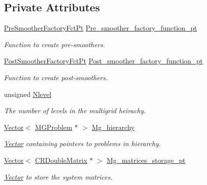 \subsection*{Private Attributes}
\begin{DoxyCompactItemize}
\item 
\hyperlink{classoomph_1_1MGSolver_a43de5ad4985ae1bbe68388619a9db32a}{Pre\+Smoother\+Factory\+Fct\+Pt} \hyperlink{classoomph_1_1MGSolver_af7d8204d7b71b18f5362b01a971aad02}{Pre\+\_\+smoother\+\_\+factory\+\_\+function\+\_\+pt}
\begin{DoxyCompactList}\small\item\em Function to create pre-\/smoothers. \end{DoxyCompactList}\item 
\hyperlink{classoomph_1_1MGSolver_a72fa4eb80c0b5a0ec6811dcd92b30231}{Post\+Smoother\+Factory\+Fct\+Pt} \hyperlink{classoomph_1_1MGSolver_a2c105a6889f43968c9e57366f44ebd79}{Post\+\_\+smoother\+\_\+factory\+\_\+function\+\_\+pt}
\begin{DoxyCompactList}\small\item\em Function to create post-\/smoothers. \end{DoxyCompactList}\item 
unsigned \hyperlink{classoomph_1_1MGSolver_a4ab5b80c46b66867e720b1c28f170bb9}{Nlevel}
\begin{DoxyCompactList}\small\item\em The number of levels in the multigrid heirachy. \end{DoxyCompactList}\item 
\hyperlink{classoomph_1_1Vector}{Vector}$<$ \hyperlink{classoomph_1_1MGProblem}{M\+G\+Problem} $\ast$ $>$ \hyperlink{classoomph_1_1MGSolver_ab6a410abeb049aec45409a5cf74597f6}{Mg\+\_\+hierarchy}
\begin{DoxyCompactList}\small\item\em \hyperlink{classoomph_1_1Vector}{Vector} containing pointers to problems in hierarchy. \end{DoxyCompactList}\item 
\hyperlink{classoomph_1_1Vector}{Vector}$<$ \hyperlink{classoomph_1_1CRDoubleMatrix}{C\+R\+Double\+Matrix} $\ast$ $>$ \hyperlink{classoomph_1_1MGSolver_a90b372c8339dda0589493bd1a1b58b6a}{Mg\+\_\+matrices\+\_\+storage\+\_\+pt}
\begin{DoxyCompactList}\small\item\em \hyperlink{classoomph_1_1Vector}{Vector} to store the system matrices. \end{DoxyCompactList}\item 

\end{DoxyCompactItemize}
